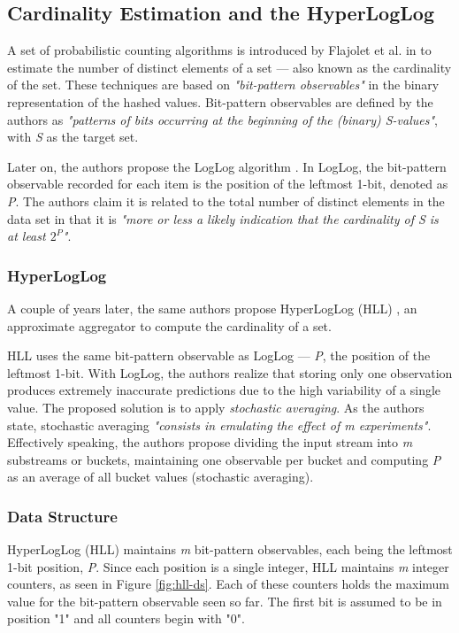 \subsection{Cardinality Estimation and the HyperLogLog}
A set of probabilistic counting algorithms is introduced by Flajolet et al. in \cite{Flajolet-PCA} to estimate the number of distinct elements of a set --- also known as the cardinality of the set. These techniques are based on \textit{"bit-pattern observables"} in the binary representation of the hashed values. Bit-pattern observables are defined by the authors as \textit{"patterns of bits occurring at the beginning of the (binary) S-values"}, with \textit{S} as the target set.

Later on, the authors propose the LogLog algorithm \cite{Flajolet-LogLog}. In LogLog, the bit-pattern observable recorded for each item is the position of the leftmost 1-bit, denoted as \textit{P}. The authors claim it is related to the total number of distinct elements in the data set in that it is \textit{"more or less a likely indication that the cardinality of S is at least $2^P$"}.


\subsubsection*{HyperLogLog}
A couple of years later, the same authors propose HyperLogLog (HLL) \cite{Flajolet-HLL}, an approximate aggregator to compute the cardinality of a set. 

HLL uses the same bit-pattern observable as LogLog --- \textit{P}, the position of the leftmost 1-bit. With LogLog, the authors realize that storing only one observation produces extremely inaccurate predictions due to the high variability of a single value. The proposed solution is to apply \textit{stochastic averaging}. As the authors state, stochastic averaging \textit{"consists in emulating the effect of m experiments"}. Effectively speaking, the authors propose dividing the input stream into \textit{m} substreams or buckets, maintaining one observable per bucket and computing \textit{P} as an average of all bucket values (stochastic averaging).

\subsubsection*{Data Structure}
HyperLogLog (HLL) maintains \textit{m} bit-pattern observables, each being the leftmost 1-bit position, \textit{P}. Since each position is a single integer, HLL maintains \textit{m} integer counters, as seen in Figure \ref{fig:hll-ds}. Each of these counters holds the maximum value for the bit-pattern observable seen so far. The first bit is assumed to be in position "1" and all counters begin with "0".

